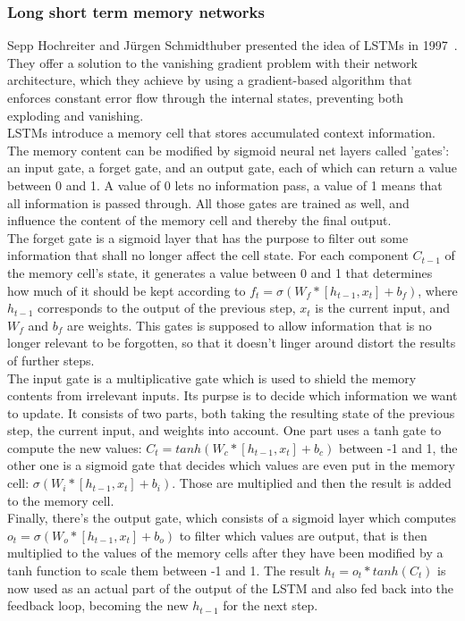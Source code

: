 \documentclass[
a4paper,
pagesize,
pdftex,
12pt,
twoside, %
BCOR=5mm, %
ngerman,
fleqn,
final,
]{scrartcl}
\begin{document}
	\subsubsection{Long short term memory networks}\label{LSTM}
	Sepp Hochreiter and Jürgen Schmidthuber presented the idea of LSTMs in 1997~\cite{Hochreiter.1997}. They offer a solution to the vanishing gradient problem with their network architecture, which they achieve by using a gradient-based algorithm that enforces constant error flow through the internal states, preventing both exploding and vanishing.\\
	LSTMs introduce a memory cell that stores accumulated context information. The memory content can be modified by sigmoid neural net layers called 'gates': an input gate, a forget gate, and an output gate, each of which can return a value between 0 and 1. A value of 0 lets no information pass, a value of 1 means that all information is passed through. All those gates are trained as well, and influence the content of the memory cell and thereby the final output.\\
	The forget gate is a sigmoid layer that has the purpose to filter out some information that shall no longer affect the cell state. For each component $C_{t-1}$ of the memory cell's state, it generates a value between 0 and 1 that determines how much of it should be kept according to $f_t = \sigma (W_f * [h_{t-1}, x_t] + b_f)$, where $h_{t-1}$ corresponds to the output of the previous step, $x_t$ is the current input, and $W_f$ and $b_f$ are weights. This gates is supposed to allow information that is no longer relevant to be forgotten, so that it doesn't linger around distort the results of further steps.\\
	The input gate is a multiplicative gate which is used to shield the memory contents from irrelevant inputs. Its purpse is to decide which information we want to update. It consists of two parts, both taking the resulting state of the previous step, the current input, and weights into account. One part uses a tanh gate to compute the new values: $C_t = tanh (W_c * [h_{t-1} , x_t] + b_c)$ between -1 and 1, the other one is a sigmoid gate that decides which values are even put in the memory cell: $\sigma (W_i * [h_{t-1}, x_t] + b_i)$. Those are multiplied and then the result is added to the memory cell.\\
	Finally, there's the output gate, which consists of a sigmoid layer which computes $o_t = \sigma (W_o * [h_{t-1}, x_t] + b_o)$ to filter which values are output, that is then multiplied to the values of the memory cells after they have been modified by a tanh function to scale them between -1 and 1. The result $h_t = o_t * tanh(C_t)$ is now used as an actual part of the output of the LSTM and also fed back into the feedback loop, becoming the new $h_{t-1}$ for the next step.	
	
\end{document}
